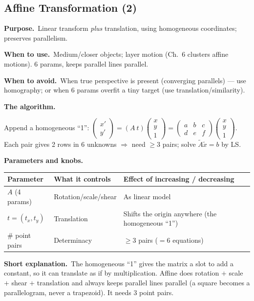 \documentclass[10pt]{article}
\makeatletter
\newcommand{\Purpose}{\par\smallskip\textbf{Purpose.}\ }
\newcommand{\WhenUse}{\par\textbf{When to use.}\ }
\newcommand{\WhenAvoid}{\par\textbf{When to avoid.}\ }
\newcommand{\TheAlgo}{\par\smallskip\textbf{The algorithm.}\par\nopagebreak}
\newcommand{\Knobs}{\par\smallskip\textbf{Parameters and knobs.}\par\nopagebreak}
\newcommand{\ShortExp}{\par\smallskip\textbf{Short explanation.}\ }
\newenvironment{ptable}{\begin{center}\small\begin{tabular}{@{}p{2.5cm} p{5.9cm} p{6.2cm}@{}}\toprule
Parameter & What it controls & Effect of increasing / decreasing \\ \midrule}
{\bottomrule\end{tabular}\end{center}}
\makeatother
\begin{document}
\subsection{Affine Transformation (2)}
\Purpose Linear transform \emph{plus} translation, using homogeneous coordinates; preserves parallelism.
\WhenUse Medium/closer objects; layer motion (Ch.\ 6 clusters affine motions). 6 params, keeps parallel
lines parallel.
\WhenAvoid When true perspective is present (converging parallels) --- use homography; or when 6 params
overfit a tiny target (use translation/similarity).
\TheAlgo Append a homogeneous ``1'': $\begin{pmatrix}x'\\y'\end{pmatrix}=(A\ t)\begin{pmatrix}x\\y\\1\end{pmatrix}
=\begin{pmatrix}a&b&c\\d&e&f\end{pmatrix}\begin{pmatrix}x\\y\\1\end{pmatrix}$. Each pair gives 2 rows in
6 unknowns $\Rightarrow$ need $\geq3$ pairs; solve $\tilde A\tilde x=b$ by LS.
\Knobs
\begin{ptable}
$A$ (4 params) & Rotation/scale/shear & As linear model \\
$t=(t_x,t_y)$ & Translation & Shifts the origin anywhere (the homogeneous ``1'') \\
\# point pairs & Determinacy & $\geq3$ pairs ($=6$ equations) \\
\end{ptable}
\ShortExp The homogeneous ``1'' gives the matrix a slot to add a constant, so it can translate as if by
multiplication. Affine does rotation $+$ scale $+$ shear $+$ translation and always keeps parallel lines
parallel (a square becomes a parallelogram, never a trapezoid). It needs 3 point pairs.

\end{document}
